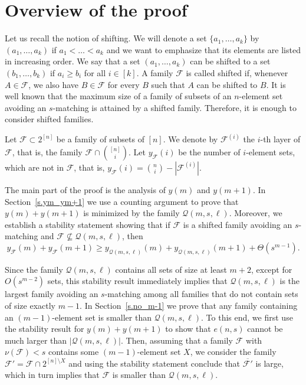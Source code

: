 \documentclass[12pt,a4paper]{article}
\begin{document}
	\section{Overview of the proof}\label{sec3}
Let us recall the notion of shifting. We will denote a set $\{a_1, \ldots, a_k\}$ by $(a_1, \ldots, a_k)$ if $a_1 < \ldots < a_k$ and we want to emphasize that its elements are listed in increasing order. We say that a set $(a_1, \ldots, a_k)$ can be shifted to a set $(b_1, \ldots, b_k)$ if $a_i \geq b_i$ for all $i \in [k]$. A family $\mathcal{F}$ is called shifted if, whenever $A \in \mathcal{F}$, we also have $B \in \mathcal{F}$ for every $B$ such that $A$ can be shifted to $B$. It is well known \cite{Frankl_Shifting} that the maximum size of a family of subsets of an $n$-element set avoiding an $s$-matching is attained by a shifted family. Therefore, it is enough to consider shifted families.

    Let $\mathcal{F} \subset 2^{[n]}$ be a family of subsets of $[n]$.
    We denote by $\mathcal{F}^{(i)}$ the $i$-th layer of $\mathcal{F}$, that is, the family $\mathcal{F} \cap {[n] \choose i}$. Let $y_{\mathcal{F}}(i)$ be the number of $i$-element sets, which are not in $\mathcal{F}$, that is, $y_{\mathcal{F}}(i) = {n \choose i} - |\mathcal{F}^{(i)}|$. 


The main part of the proof is the analysis of $y(m)$ and $y(m+1)$. In Section~\ref{s.ym_ym+1} we use a counting argument to prove that $y(m) + y(m+1)$ is minimized by the family $\mathcal{Q}(m, s, \ell)$. Moreover, we establish a stability statement showing that if $\mathcal{F}$ is a shifted family avoiding an $s$-matching and $\mathcal{F} \nsubseteq \mathcal{Q}(m, s, \ell)$, then
\[
y_{\mathcal{F}}(m) + y_{\mathcal{F}}(m+1)
\ge
y_{\mathcal{Q}(m,s,\ell)}(m) + y_{\mathcal{Q}(m,s,\ell)}(m+1) + \Theta(s^{m-1}).
\]

Since the family $\mathcal{Q}(m, s, \ell)$ contains all sets of size at least $m+2$, except for $O(s^{m-2})$ sets, this stability result immediately implies that $\mathcal{Q}(m, s, \ell)$ is the largest family avoiding an $s$-matching among all families that do not contain sets of size exactly $m-1$. In Section~\ref{s.no_m-1} we prove that any family containing an $(m-1)$-element set is smaller than $\mathcal{Q}(m, s, \ell)$. To this end, we first use the stability result for $y(m) + y(m+1)$ to show that $e(n, s)$ cannot be much larger than $|\mathcal{Q}(m, s, \ell)|$. Then, assuming that a family $\mathcal{F}$ with $\nu(\mathcal{F}) < s$ contains some $(m-1)$-element set $X$, we consider the family $\mathcal{F}' = \mathcal{F} \cap 2^{[n]\setminus X}$ and using the stability statement conclude that $\overline{\mathcal F'}$ is large, which in turn implies that $\mathcal F$ is smaller than $\mathcal{Q}(m, s, \ell)$.
\end{document}
